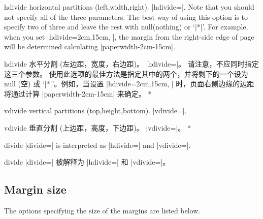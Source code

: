 \begin{Options}
\begin{paracol}{2}
\item[hdivide] horizontal partitions (left,width,right).
  |hdivide=|. 
  Note that you should not specify all of the three parameters.
  The best way of using this option is to specify two of three and 
  leave the rest with null(nothing) or `|*|'. For example, when you set
  |hdivide={2cm,15cm, }|, the margin from the right-side edge of page
  will be determined calculating |paperwidth-2cm-15cm|.
\switchcolumn
\item[hdivide] 水平分割 (左边距，宽度，右边距)。
|hdivide=|。
请注意，不应同时指定这三个参数。
使用此选项的最佳方法是指定其中的两个，并将剩下的一个设为 null (空) 或 `|*|'。例如，当设置 |hdivide={2cm,15cm, }| 时，页面右侧边缘的边距将通过计算 |paperwidth-2cm-15cm| 来确定。
\switchcolumn[0]*
\item[vdivide] vertical partitions (top,height,bottom).
|vdivide=|.
\switchcolumn
\item[vdivide] 垂直分割 (上边距，高度，下边距)。
|vdivide=|。
\switchcolumn[0]*
\item[divide] |divide=| is interpreted  as 
|hdivide=| and |vdivide=|.
\switchcolumn
\item[divide] |divide=| 被解释为 |hdivide=| 和 |vdivide=|。
\end{paracol}
\end{Options}

\subsection{Margin size}\label{sec:margin}

The options specifying the size of the margins are listed below.

